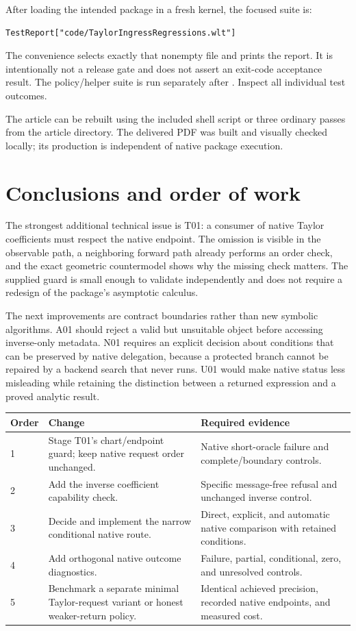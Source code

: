 \documentclass[11pt,letterpaper]{article}
\theoremstyle{definition}\newtheorem{definition}[proposition]{Definition}
\begin{document}
After loading the intended package in a fresh kernel, the focused suite is:
\begin{lstlisting}
TestReport["code/TaylorIngressRegressions.wlt"]
\end{lstlisting}
The convenience  selects exactly that nonempty file and
prints the report. It is intentionally not a release gate and does not assert
an exit-code acceptance result. The policy/helper suite is run separately after
. Inspect all individual test outcomes.

The article can be rebuilt using the included shell script or three ordinary
 passes from the article directory. The delivered PDF was built
and visually checked locally; its production is independent of native package
execution.

\section{Conclusions and order of work}
The strongest additional technical issue is T01: a consumer of native Taylor
coefficients must respect the native endpoint. The omission is visible in the
observable path, a neighboring forward path already performs an order check,
and the exact geometric countermodel shows why the missing check matters.
The supplied guard is small enough to validate independently and does not
require a redesign of the package's asymptotic calculus.

The next improvements are contract boundaries rather than new symbolic
algorithms. A01 should reject a valid but unsuitable object before accessing
inverse-only metadata. N01 requires an explicit decision about conditions that
can be preserved by native delegation, because a protected branch cannot be
repaired by a backend search that never runs. U01 would make native status
less misleading while retaining the distinction between a returned expression
and a proved analytic result.

\begin{tabularx}{\linewidth}{@{}P{0.55in}YP{1.6in}@{}}
\toprule
Order & Change & Required evidence\\
 & Stage T01's chart/endpoint guard; keep native request order unchanged. & Native short-oracle failure and complete/boundary controls.\\
2 & Add the inverse coefficient capability check. & Specific message-free refusal and unchanged inverse control.\\
3 & Decide and implement the narrow conditional native route. & Direct, explicit, and automatic native comparison with retained conditions.\\
4 & Add orthogonal native outcome diagnostics. & Failure, partial, conditional, zero, and unresolved controls.\\
5 & Benchmark a separate minimal Taylor-request variant or honest weaker-return policy. & Identical achieved precision, recorded native endpoints, and measured cost.\\
\bottomrule
\end{tabularx}
\end{document}
